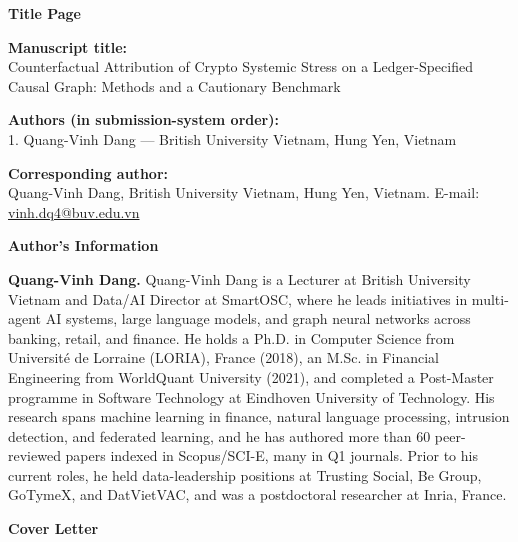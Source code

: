 \documentclass[11pt]{article}
\begin{document}
\begin{center}
{\LARGE\bfseries Title Page}
\end{center}

\vspace{1em}
\noindent\textbf{Manuscript title:}\\
Counterfactual Attribution of Crypto Systemic Stress on a Ledger-Specified Causal Graph: Methods and a Cautionary Benchmark

\vspace{1em}
\noindent\textbf{Authors (in submission-system order):}\\
1. Quang-Vinh Dang --- British University Vietnam, Hung Yen, Vietnam

\vspace{1em}
\noindent\textbf{Corresponding author:}\\
Quang-Vinh Dang, British University Vietnam, Hung Yen, Vietnam.
E-mail: \href{mailto:vinh.dq4@buv.edu.vn}{vinh.dq4@buv.edu.vn}

\bigskip
\hrulefill

\vspace{1.5em}
\begin{center}
{\LARGE\bfseries Author's Information}
\end{center}

\vspace{1em}
\noindent\textbf{Quang-Vinh Dang.}\quad
Quang-Vinh Dang is a Lecturer at British University Vietnam and Data/AI
Director at SmartOSC, where he leads initiatives in multi-agent AI systems,
large language models, and graph neural networks across banking, retail, and
finance. He holds a Ph.D. in Computer Science from Universit\'e de Lorraine
(LORIA), France (2018), an M.Sc. in Financial Engineering from WorldQuant
University (2021), and completed a Post-Master programme in Software
Technology at Eindhoven University of Technology. His research spans machine
learning in finance, natural language processing, intrusion detection, and
federated learning, and he has authored more than 60 peer-reviewed papers
indexed in Scopus/SCI-E, many in Q1 journals. Prior to his current roles, he
held data-leadership positions at Trusting Social, Be Group, GoTymeX, and
DatVietVAC, and was a postdoctoral researcher at Inria, France.

\bigskip
\hrulefill

\vspace{1.5em}
\begin{center}
{\LARGE\bfseries Cover Letter}
\end{center}
\end{document}
